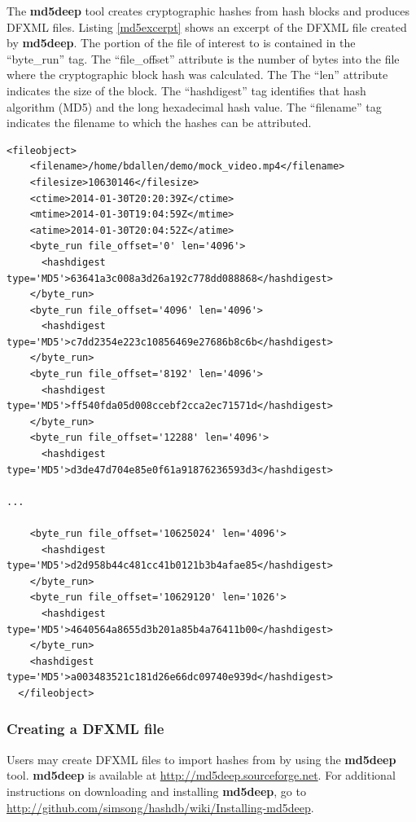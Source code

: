 \documentclass[11pt,fleqn]{article} %
\begin{document}
The \textbf{md5deep} tool creates cryptographic hashes from hash blocks and produces DFXML files. Listing \ref{md5excerpt} shows an excerpt of the DFXML file created by \textbf{md5deep}. The portion of the file of interest to \hash is contained in the ``byte\_run'' tag. The ``file\_offset'' attribute is the number of bytes into the file where the cryptographic block hash was calculated. The The  ``len'' attribute indicates the size of the block.  The ``hashdigest'' tag identifies that hash algorithm (MD5) and the long hexadecimal hash value. The ``filename'' tag indicates the filename to which the hashes can be attributed. \\
\lstset{style=customfile}
\begin{lstlisting}[float, caption=Excerpt of a DFXML report file showing the MD5 output, label=md5excerpt]
  <fileobject>
    <filename>/home/bdallen/demo/mock_video.mp4</filename>
    <filesize>10630146</filesize>
    <ctime>2014-01-30T20:20:39Z</ctime>
    <mtime>2014-01-30T19:04:59Z</mtime>
    <atime>2014-01-30T20:04:52Z</atime>
    <byte_run file_offset='0' len='4096'>   
      <hashdigest type='MD5'>63641a3c008a3d26a192c778dd088868</hashdigest>
    </byte_run>
    <byte_run file_offset='4096' len='4096'>   
      <hashdigest type='MD5'>c7dd2354e223c10856469e27686b8c6b</hashdigest>
    </byte_run>
    <byte_run file_offset='8192' len='4096'>   
      <hashdigest type='MD5'>ff540fda05d008ccebf2cca2ec71571d</hashdigest>
    </byte_run>
    <byte_run file_offset='12288' len='4096'>   
      <hashdigest type='MD5'>d3de47d704e85e0f61a91876236593d3</hashdigest>

...

    <byte_run file_offset='10625024' len='4096'>   
      <hashdigest type='MD5'>d2d958b44c481cc41b0121b3b4afae85</hashdigest>
    </byte_run>
    <byte_run file_offset='10629120' len='1026'>   
      <hashdigest type='MD5'>4640564a8655d3b201a85b4a76411b00</hashdigest>
    </byte_run>
    <hashdigest type='MD5'>a003483521c181d26e66dc09740e939d</hashdigest>
  </fileobject>

\end{lstlisting}  

\subsubsection{Creating a DFXML file}
\label{createDFXML}
Users may create DFXML files to import hashes from by using the
\textbf{md5deep} tool.
\textbf{md5deep} is available at \url{http://md5deep.sourceforge.net}.
For additional instructions on downloading and installing
\textbf{md5deep}, go to \url{http://github.com/simsong/hashdb/wiki/Installing-md5deep}.\\
\end{document}

